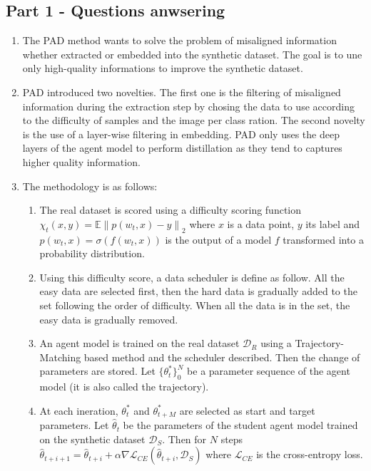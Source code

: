 \documentclass[onecolumn]{IEEEtran}
\begin{document}
\subsection{Part 1 - Questions anwsering}
\begin{enumerate}[label=(\alph*)]
    \item The PAD method wants to solve the problem of misaligned information whether extracted or embedded into the synthetic dataset. The goal is to une only high-quality informations to improve the synthetic dataset.
    \vspace{3mm}
    \item PAD introduced two novelties. The first one is the filtering of misaligned information during the extraction step by chosing the data to use according to the difficulty of samples and the image per class ration. The second novelty is the use of a layer-wise filtering in embedding. PAD only uses the deep layers of the agent model to perform distillation as they tend to captures higher quality information.
    \vspace{3mm}
    \item The methodology is as follows:
    \begin{enumerate}[label=(\arabic*)]
        \item The real dataset is scored using a difficulty scoring function $\chi_t(x, y) = \mathbb{E} \left\| p(w_t, x) - y \right\|_2$ where $x$ is a data point, $y$ its label and $p(w_t,x)=\sigma(f(w_t, x))$ is the output of a model $f$ transformed into a probability distribution.
        \item Using this difficulty score, a data scheduler is define as follow. All the easy data are selected first, then the hard data is gradually added to the set following the order of difficulty. When all the data is in the set, the easy data is gradually removed.
        \item An agent model is trained on the real dataset $\mathcal{D}_R$ using a Trajectory-Matching based method and the scheduler described. Then the change of parameters are stored. Let $\{\theta_t^*\}_0^N$ be a parameter sequence of the agent model (it is also called the trajectory). 
        \item At each ineration, $\theta_t^*$ and $\theta_{t+M}^*$ are selected as start and target parameters. Let $\hat\theta_t$ be the parameters of the student agent model trained on the synthetic dataset $\mathcal{D}_S$. Then for $N$ steps $\hat\theta_{t+i+1} = \hat\theta_{t+i} + \alpha \nabla\mathcal{L}_{CE}(\hat\theta_{t+i}, \mathcal{D}_S)$ where $\mathcal{L}_{CE}$ is the cross-entropy loss.

\end{enumerate}
\end{enumerate}
\end{document}
